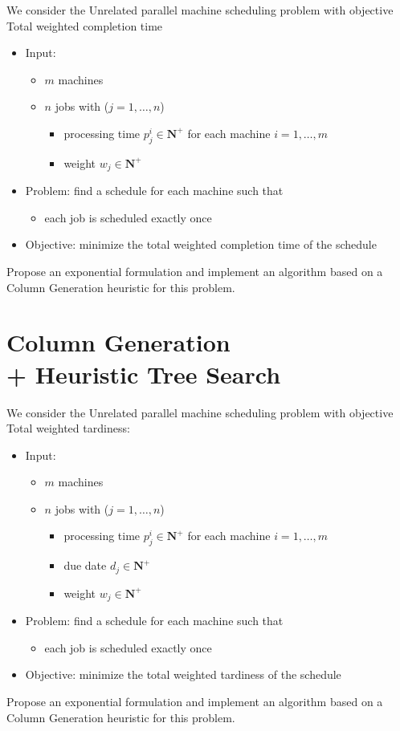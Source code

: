 \documentclass[a4paper,twocolumn]{article}
\newcommand{\N}{\mathbf{N}}
\begin{document}
We consider the Unrelated parallel machine scheduling problem with objective Total weighted completion time
\begin{itemize}
  \item Input:
    \begin{itemize}
      \item $m$ machines
      \item $n$ jobs with ($j = 1, \dots, n$)
        \begin{itemize}
          \item processing time $p_j^i \in \N^+$ for each machine $i = 1, \dots, m$
          \item weight $w_j \in \N^+$
        \end{itemize}
    \end{itemize}
  \item Problem: find a schedule for each machine such that
    \begin{itemize}
      \item each job is scheduled exactly once
    \end{itemize}
  \item Objective: minimize the total weighted completion time of the schedule
\end{itemize}

Propose an exponential formulation and implement an algorithm based on a Column Generation heuristic for this problem.

\section{Column Generation \\ + Heuristic Tree Search}

We consider the Unrelated parallel machine scheduling problem with objective Total weighted tardiness:
\begin{itemize}
  \item Input:
    \begin{itemize}
      \item $m$ machines
      \item $n$ jobs with ($j = 1, \dots, n$)
        \begin{itemize}
          \item processing time $p_j^i \in \N^+$ for each machine $i = 1, \dots, m$
          \item due date $d_j \in \N^+$
          \item weight $w_j \in \N^+$
        \end{itemize}
    \end{itemize}
  \item Problem: find a schedule for each machine such that
    \begin{itemize}
      \item each job is scheduled exactly once
    \end{itemize}
  \item Objective: minimize the total weighted tardiness of the schedule
\end{itemize}

Propose an exponential formulation and implement an algorithm based on a Column Generation heuristic for this problem.
\end{document}
